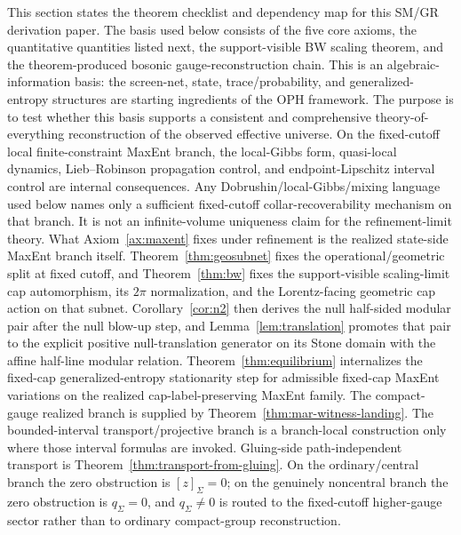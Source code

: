 \documentclass[11pt]{article}
\begin{document}
This section states the theorem checklist and dependency map for this SM/GR derivation paper. The basis used below consists of the five core axioms, the quantitative quantities listed next, the support-visible BW scaling theorem, and the theorem-produced bosonic gauge-reconstruction chain. This is an algebraic-information basis: the screen-net, state, trace/probability, and generalized-entropy structures are starting ingredients of the OPH framework. The purpose is to test whether this basis supports a consistent and comprehensive theory-of-everything reconstruction of the observed effective universe. On the fixed-cutoff local finite-constraint MaxEnt branch, the local-Gibbs form, quasi-local dynamics, Lieb--Robinson propagation control, and endpoint-Lipschitz interval control are internal consequences. Any Dobrushin/local-Gibbs/mixing language used below names only a sufficient fixed-cutoff collar-recoverability mechanism on that branch. It is not an infinite-volume uniqueness claim for the refinement-limit theory. What Axiom~\ref{ax:maxent} fixes under refinement is the realized state-side MaxEnt branch itself. Theorem~\ref{thm:geosubnet} fixes the operational/geometric split at fixed cutoff, and Theorem~\ref{thm:bw} fixes the support-visible scaling-limit cap automorphism, its \(2\pi\) normalization, and the Lorentz-facing geometric cap action on that subnet. Corollary~\ref{cor:n2} then derives the null half-sided modular pair after the null blow-up step, and Lemma~\ref{lem:translation} promotes that pair to the explicit positive null-translation generator on its Stone domain with the affine half-line modular relation. Theorem~\ref{thm:equilibrium} internalizes the fixed-cap generalized-entropy stationarity step for admissible fixed-cap MaxEnt variations on the realized cap-label-preserving MaxEnt family. The compact-gauge realized branch is supplied by Theorem~\ref{thm:mar-witness-landing}. The bounded-interval transport/projective branch is a branch-local construction only where those interval formulas are invoked. Gluing-side path-independent transport is Theorem~\ref{thm:transport-from-gluing}. On the ordinary/central branch the zero obstruction is \([z]_\Sigma=0\); on the genuinely noncentral branch the zero obstruction is \(q_\Sigma=0\), and \(q_\Sigma\ne0\) is routed to the fixed-cutoff higher-gauge sector rather than to ordinary compact-group reconstruction.
\end{document}
